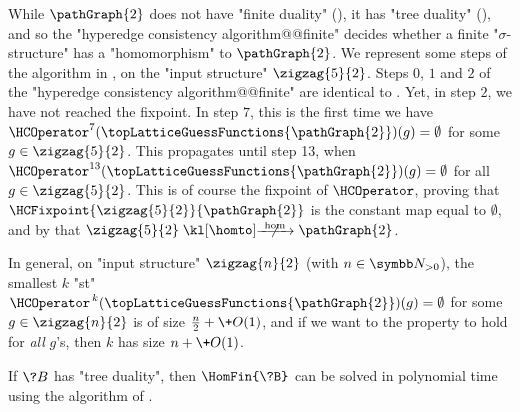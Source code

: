 \begin{example}
	\AP\label{ex:zigzag-HC-P2}
	While $\pathGraph{2}$ does not have "finite duality" (), it has
	"tree duality" (), and so the "hyperedge consistency algorithm@@finite"
	decides whether a finite "$\sigma$-structure" has a "homomorphism" to $\pathGraph{2}$.
	We represent some steps of the algorithm in ,
	on the "input structure" $\zigzag{5}{2}$.
	Steps $0$, $1$ and $2$ of the "hyperedge consistency algorithm@@finite"
	are identical to .
	Yet, in step $2$, we have not reached the fixpoint.
	In step $7$, this is the first time
	we have $\HCOperator^{7}(\topLatticeGuessFunctions{\pathGraph{2}})(g) = \emptyset$ for some
	$g\in \zigzag{5}{2}$. This propagates until step 13, 
	when $\HCOperator^{13}(\topLatticeGuessFunctions{\pathGraph{2}})(g) = \emptyset$
	for all $g\in \zigzag{5}{2}$. This is of course the fixpoint of $\HCOperator$,
	proving that $\HCFixpoint{\zigzag{5}{2}}{\pathGraph{2}}$ is the constant map
	equal to $\emptyset$, and by 
	that $\zigzag{5}{2} \nothomto \pathGraph{2}$.

	In general, on "input structure" $\zigzag{n}{2}$ (with $n\in\Np$),
	the smallest $k$ "st" $\HCOperator^{\,k}(\topLatticeGuessFunctions{\pathGraph{2}})(g) = \emptyset$
	for some $g \in \zigzag{n}{2}$ is of size $\frac{n}{2} + \+O(1)$,
	and if we want to the property to hold for \emph{all} $g$'s,
	then $k$ has size $n + \+O(1)$.
\end{example}

\begin{corollary}
	If $\?B$ has "tree duality", then $\HomFin{\?B}$ can be solved in
	polynomial time using the algorithm of .
\end{corollary}



